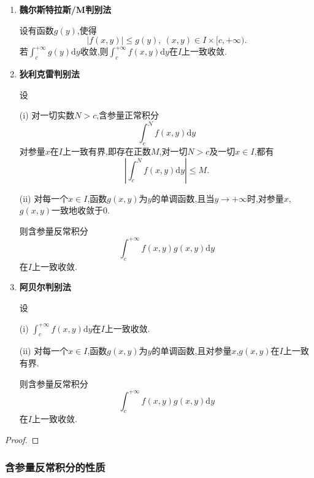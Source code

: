 \documentclass[../../main.tex]{subfiles}%
\begin{document}
\begin{theorem}[含参量反常积分一致收敛判别法]
\begin{enumerate}
\item \textbf{魏尔斯特拉斯/M判别法} 

设有函数$g(y)$,使得
\[
|f(x,y)| \leqslant g(y),\ (x,y) \in I \times [c, +\infty).
\]
若$\int_{c}^{+\infty} g(y)\mathrm{d}y$收敛,则$\int_{c}^{+\infty} f(x,y)\mathrm{d}y$在$I$上一致收敛.

\item \textbf{狄利克雷判别法} 

设

(i) 对一切实数$N > c$,含参量正常积分
\[
\int_{c}^{N} f(x,y)\mathrm{d}y
\]
对参量$x$在$I$上一致有界,即存在正数$M$,对一切$N > c$及一切$x \in I$,都有
\[
\left| \int_{c}^{N} f(x,y)\mathrm{d}y \right| \leqslant M.
\]

(ii) 对每一个$x \in I$,函数$g(x,y)$为$y$的单调函数,且当$y \to +\infty$时,对参量$x$,$g(x,y)$一致地收敛于0.

则含参量反常积分
\[
\int_{c}^{+\infty} f(x,y)g(x,y)\mathrm{d}y
\]
在$I$上一致收敛.

\item \textbf{阿贝尔判别法} 

设

(i) $\int_{c}^{+\infty} f(x,y)\mathrm{d}y$在$I$上一致收敛.

(ii) 对每一个$x \in I$,函数$g(x,y)$为$y$的单调函数,且对参量$x$,$g(x,y)$在$I$上一致有界.

则含参量反常积分
\[
\int_{c}^{+\infty} f(x,y)g(x,y)\mathrm{d}y
\]
在$I$上一致收敛.
\end{enumerate}
\end{theorem}
\begin{proof}



\end{proof}


\subsubsection{含参量反常积分的性质}
\end{document}
